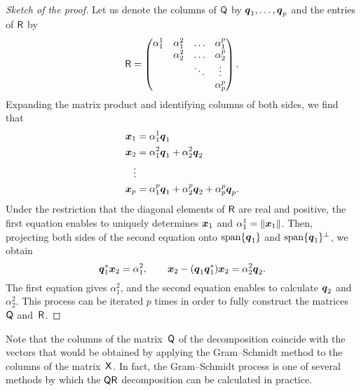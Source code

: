 \begin{proof}
    [Sketch of the proof]
    Let us denote the columns of $\mathsf Q$ by $\mathbf{\boldsymbol{q}}_1, \dotsc, \mathbf{\boldsymbol{q}}_p$ and the entries of $\mathsf R$ by
    \[
        \mathsf R =
        \begin{pmatrix}
            \alpha^1_1 & \alpha^2_1 & \hdots & \alpha^p_1 \\
                       & \alpha^2_2 & \hdots & \alpha^p_2 \\
                       &            & \ddots & \vdots \\
                       & & & \alpha^p_p
        \end{pmatrix}.
    \]
    Expanding the matrix product and identifying columns of both sides,
    we find that
    \begin{align*}
        \mathbf{\boldsymbol{x}}_1 &= \alpha^1_1 \mathbf{\boldsymbol{q}}_1 \\
        \mathbf{\boldsymbol{x}}_2 &= \alpha^2_1 \mathbf{\boldsymbol{q}}_1 + \alpha^2_2 \mathbf{\boldsymbol{q}}_2 \\
        \vdots \\
        \mathbf{\boldsymbol{x}}_p &= \alpha^p_1 \mathbf{\boldsymbol{q}}_1 + \alpha^p_2 \mathbf{\boldsymbol{q}}_2 + \alpha^p_p \mathbf{\boldsymbol{q}}_p.
    \end{align*}
    Under the restriction that the diagonal elements of $\mathsf R$ are real and positive,
    the first equation enables to uniquely determines $\mathbf{\boldsymbol{x}}_1$ and $\alpha^1_1 = \lVert\mathbf{\boldsymbol{x}}_1\rVert$.
    Then, projecting both sides of the second equation onto $\operatorname{span} \{ \mathbf{\boldsymbol{q}}_1 \}$ and $\operatorname{span} \{ \mathbf{\boldsymbol{q}}_1 \}^\perp$,
    we obtain
    \[
        \mathbf{\boldsymbol{q}}_1^* \mathbf{\boldsymbol{x}}_2 = \alpha_1^2, \qquad
        \mathbf{\boldsymbol{x}}_2 - (\mathbf{\boldsymbol{q}}_1 \mathbf{\boldsymbol{q}}_1^*) \mathbf{\boldsymbol{x}}_2 = \alpha^2_2 \mathbf{\boldsymbol{q}}_2.
    \]
    The first equation gives $\alpha_1^2$,
    and the second equation enables to calculate $\mathbf{\boldsymbol{q}}_2$ and $\alpha^2_2$.
    This process can be iterated $p$ times in order to fully construct the matrices~$\mathsf Q$ and~$\mathsf R$.
\end{proof}
Note that the columns of the matrix~$\mathsf Q$ of the decomposition coincide with the vectors that
would be obtained by applying the Gram--Schmidt method to the columns of the matrix~$\mathsf X$.
In fact, the Gram--Schmidt process is one of several methods by which the $\mathsf Q \mathsf R$ decomposition can be calculated in practice.


